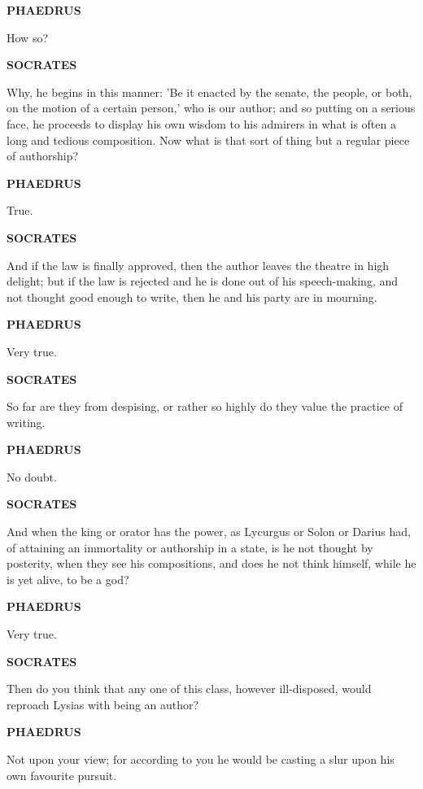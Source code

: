 \documentclass[11pt,letter]{article}
\begin{document}
\par \textbf{PHAEDRUS}
\par   How so?

\par \textbf{SOCRATES}
\par   Why, he begins in this manner:  'Be it enacted by the senate, the people, or both, on the motion of a certain person,' who is our author; and so putting on a serious face, he proceeds to display his own wisdom to his admirers in what is often a long and tedious composition. Now what is that sort of thing but a regular piece of authorship?

\par \textbf{PHAEDRUS}
\par   True.

\par \textbf{SOCRATES}
\par   And if the law is finally approved, then the author leaves the theatre in high delight; but if the law is rejected and he is done out of his speech-making, and not thought good enough to write, then he and his party are in mourning.

\par \textbf{PHAEDRUS}
\par   Very true.

\par \textbf{SOCRATES}
\par   So far are they from despising, or rather so highly do they value the practice of writing.

\par \textbf{PHAEDRUS}
\par   No doubt.

\par \textbf{SOCRATES}
\par   And when the king or orator has the power, as Lycurgus or Solon or Darius had, of attaining an immortality or authorship in a state, is he not thought by posterity, when they see his compositions, and does he not think himself, while he is yet alive, to be a god?

\par \textbf{PHAEDRUS}
\par   Very true.

\par \textbf{SOCRATES}
\par   Then do you think that any one of this class, however ill-disposed, would reproach Lysias with being an author?

\par \textbf{PHAEDRUS}
\par   Not upon your view; for according to you he would be casting a slur upon his own favourite pursuit.
\end{document}
